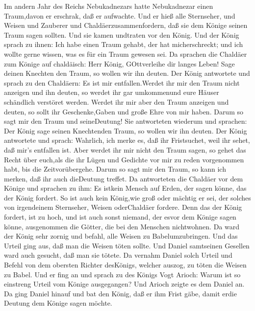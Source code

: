  Im andern Jahr des Reichs Nebukadnezars hatte Nebukadnezar
einen Traum,davon er erschrak, daß er aufwachte.  Und er
hieß alle Sternseher, und Weisen und Zauberer und
Chaldäerzusammenfordern, daß sie dem Könige seinen Traum sagen sollten.
Und sie kamen undtraten vor den König.  Und der König sprach
zu ihnen: Ich habe einen Traum gehabt, der hat micherschreckt; und ich
wollte gerne wissen, was es für ein Traum gewesen sei.  Da
sprachen die Chaldäer zum Könige auf chaldäisch: Herr König,
GOttverleihe dir langes Leben! Sage deinen Knechten den Traum, so wollen
wir ihn deuten.  Der König antwortete und sprach zu den
Chaldäern: Es ist mir entfallen.Werdet ihr mir den Traum nicht anzeigen
und ihn deuten, so werdet ihr gar umkommenund eure Häuser schändlich
verstöret werden.  Werdet ihr mir aber den Traum anzeigen
und deuten, so sollt ihr Geschenke,Gaben und große Ehre von mir haben.
Darum so sagt mir den Traum und seineDeutung!  Sie
antworteten wiederum und sprachen: Der König sage seinen Knechtenden
Traum, so wollen wir ihn deuten.  Der König antwortete und
sprach: Wahrlich, ich merke es, daß ihr Fristsuchet, weil ihr sehet, daß
mir's entfallen ist.  Aber werdet ihr mir nicht den Traum
sagen, so gehet das Recht über euch,als die ihr Lügen und Gedichte vor
mir zu reden vorgenommen habt, bis die Zeitvorübergehe. Darum so sagt
mir den Traum, so kann ich merken, daß ihr auch dieDeutung treffet.
 Da antworteten die Chaldäer vor dem Könige und sprachen zu
ihm: Es istkein Mensch auf Erden, der sagen könne, das der König
fordert. So ist auch kein König,wie groß oder mächtig er sei, der
solches von irgendeinem Sternseher, Weisen oderChaldäer fordere.
 Denn das der König fordert, ist zu hoch, und ist auch
sonst niemand, der esvor dem Könige sagen könne, ausgenommen die Götter,
die bei den Menschen nichtwohnen.  Da ward der König sehr
zornig und befahl, alle Weisen zu Babelumzubringen.  Und
das Urteil ging aus, daß man die Weisen töten sollte. Und Daniel
samtseinen Gesellen ward auch gesucht, daß man sie tötete. 
Da vernahm Daniel solch Urteil und Befehl von dem obersten Richter
desKönigs, welcher auszog, zu töten die Weisen zu Babel. 
Und er fing an und sprach zu des Königs Vogt Arioch: Warum ist so
einstreng Urteil vom Könige ausgegangen? Und Arioch zeigte es dem Daniel
an.  Da ging Daniel hinauf und bat den König, daß er ihm
Frist gäbe, damit erdie Deutung dem Könige sagen möchte. 
